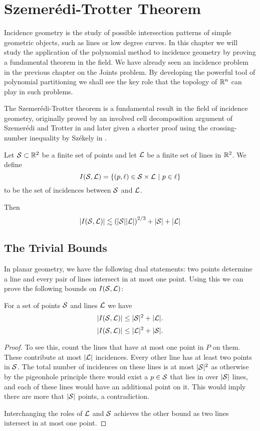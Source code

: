 \chapter{Szemerédi-Trotter Theorem \label{chap:trotter}}


Incidence geometry is the study of possible intersection patterns  of simple geometric objects, such as lines or low degree curves. 
In this chapter we will study the application of the polynomial method to incidence geometry by proving a fundamental theorem in the field.
We have already seen an incidence problem in the previous chapter on the Joints problem. 
By developing the powerful tool of polynomial partitioning we shall see the key role that the topology of $\mathbb R^n$ can play in such problems.


The Szemerédi-Trotter theorem is a fundamental result in the field of incidence geometry, originally proved by an involved cell decomposition argument
of Szemerédi and Trotter in \cite{szemeredi1983extremal} and later given a shorter proof using the crossing-number inequality by Székely in \cite{szekely1997crossing}. 
\begin{theorem}
    Let $\mathcal S \subset\mathbb R^2$ be a finite set of points and
    let $\mathcal L$ be a finite set of lines in $\mathbb R^2$. We define 
    \[I(\mathcal S,\mathcal L) = \{(p, \ell) \in \mathcal S \times \mathcal L \ | \ p \in \ell\}\] 
    to be the set of incidences between $\mathcal S$ and $\mathcal L$. 
   
    Then
    \[
        |I(\mathcal S, \mathcal L)| \lesssim \left(|\mathcal S||\mathcal L|\right)^{2/3} + |\mathcal S| + |\mathcal L|
    \]
    \label{thm:S-T}
\end{theorem}

\section{The Trivial Bounds}
In planar geometry, we have the following dual statements: two points determine a line and every pair of lines intersect in at most one point. 
Using this we can prove the following bounds on $I(\mathcal S,\mathcal L)$:
\begin{lemma}
    For a set of points $\mathcal S$ and lines $\mathcal L$ we have \label{thm:trivial-ST-bounds}
    \[|I(\mathcal S,\mathcal L)| \leq |\mathcal S|^2 + |\mathcal L|. \]
    \[|I(\mathcal S,\mathcal L)| \leq |\mathcal L|^2 + |\mathcal S|. \]
\end{lemma}
\begin{proof}

To see this, count the lines that have at most one point in $P$ on them. These contribute at most $|\mathcal L|$ incidences.
Every other line has at least two points in $\mathcal S$. The total number of incidences on these lines is at most $|\mathcal S|^2$
as otherwise by the pigeonhole principle there would exist a $p\in \mathcal S$ that lies in over $|\mathcal S|$ lines, and each of these lines would have an additional 
point on it. This would imply there are more that $|\mathcal S|$ points, a contradiction. 

Interchanging the roles of $\mathcal L$ and $\mathcal S$ achieves the other bound as two lines intersect in at most one point.
\end{proof}

